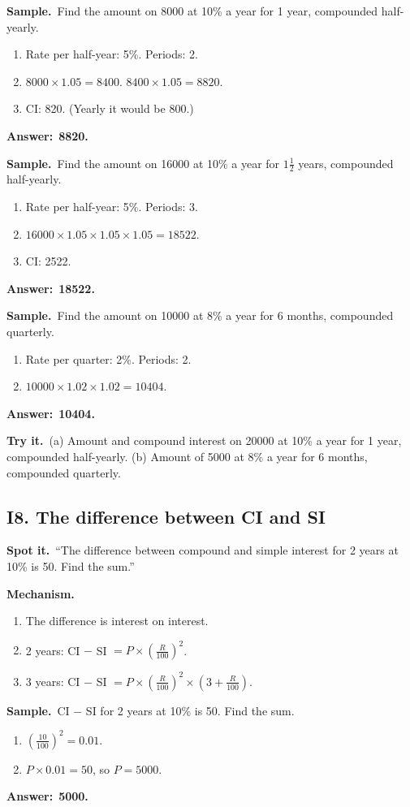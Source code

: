\documentclass[11pt,a4paper]{article}
\let\oldsubsection\subsection
\renewcommand{\subsection}{\needspace{9\baselineskip}\oldsubsection}
\newcommand{\spot}{\textbf{\color{ember}Spot it.}\ }
\newcommand{\mech}{\textbf{\color{ember}Mechanism.}\ }
\newif\ifkeepsamp
\newcommand{\ans}[1]{\par\nopagebreak\noindent\textbf{\color{ember}Answer:}\ \textbf{#1}\par}
\newcommand{\samp}{\ifkeepsamp\needspace{4\baselineskip}\fi\textbf{\color{ember}Sample.}\ }
\newcommand{\tryit}[1]{\textbf{\color{ember}Try it.}\ #1}
\begin{document}
\samp Find the amount on 8000 at 10\% a year for 1 year, compounded half-yearly.
\begin{enumerate}
\item Rate per half-year: 5\%. Periods: 2.
\item $8000 \times 1.05 = 8400$. $8400 \times 1.05 = 8820$.
\item CI: 820. (Yearly it would be 800.)
\end{enumerate}
\ans{8820.}

\samp Find the amount on 16000 at 10\% a year for $1\tfrac12$ years, compounded half-yearly.
\begin{enumerate}
\item Rate per half-year: 5\%. Periods: 3.
\item $16000 \times 1.05 \times 1.05 \times 1.05 = 18522$.
\item CI: 2522.
\end{enumerate}
\ans{18522.}

\samp Find the amount on 10000 at 8\% a year for 6 months, compounded quarterly.
\begin{enumerate}
\item Rate per quarter: 2\%. Periods: 2.
\item $10000 \times 1.02 \times 1.02 = 10404$.
\end{enumerate}
\ans{10404.}

\tryit (a) Amount and compound interest on 20000 at 10\% a year for 1 year, compounded half-yearly. (b) Amount of 5000 at 8\% a year for 6 months, compounded quarterly.

\subsection{I8. The difference between CI and SI}
\spot ``The difference between compound and simple interest for 2 years at 10\% is 50. Find the sum.''

\mech
\begin{enumerate}
\item The difference is interest on interest.
\item 2 years: CI $-$ SI $= P \times \left(\tfrac{R}{100}\right)^2$.
\item 3 years: CI $-$ SI $= P \times \left(\tfrac{R}{100}\right)^2 \times \left(3 + \tfrac{R}{100}\right)$.
\end{enumerate}

\samp CI $-$ SI for 2 years at 10\% is 50. Find the sum.
\begin{enumerate}
\item $\left(\tfrac{10}{100}\right)^2 = 0.01$.
\item $P \times 0.01 = 50$, so $P = 5000$.
\end{enumerate}
\ans{5000.}
\end{document}
